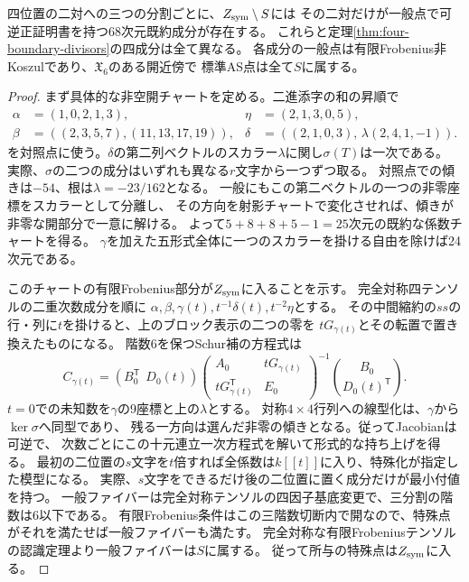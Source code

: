 \begin{theorem}[二対二配置による三つの追加境界因子]\label{thm:three-two-pair-divisors}
四位置の二対への三つの分割ごとに、$Z_{\rm sym}\setminus S$には
その二対だけが一般点で可逆正証明書を持つ68次元既約成分が存在する。
これらと定理\ref{thm:four-boundary-divisors}の四成分は全て異なる。
各成分の一般点は有限Frobenius非Koszulであり、$\mathfrak X_6$のある開近傍で
標準AS点は全て$S$に属する。
\end{theorem}
\begin{proof}
まず具体的な非空開チャートを定める。二進添字の和の昇順で
\[
\begin{aligned}
 \alpha&=(1,0,2,1,3), &\eta&=(2,1,3,0,5),\\
 \beta&=((2,3,5,7),(11,13,17,19)), &\delta&=((2,1,0,3),\,\lambda(2,4,1,-1)).
\end{aligned}
\]
を対照点に使う。$\delta$の第二列ベクトルのスカラー$\lambda$に関し$\sigma(T)$は一次である。
実際、$\sigma$の二つの成分はいずれも異なる$r$文字から一つずつ取る。
対照点での傾きは$-54$、根は$\lambda=-23/162$となる。
一般にもこの第二ベクトルの一つの非零座標をスカラーとして分離し、
その方向を射影チャートで変化させれば、傾きが非零な開部分で一意に解ける。
よって$5+8+8+5-1=25$次元の既約な係数チャートを得る。
$\gamma$を加えた五形式全体に一つのスカラーを掛ける自由を除けば24次元である。

このチャートの有限Frobenius部分が$Z_{\rm sym}$に入ることを示す。
完全対称四テンソルの二重次数成分を順に
$\alpha,\beta,\gamma(t),t^{-1}\delta(t),t^{-2}\eta$とする。
その中間縮約の$ss$の行・列に$t$を掛けると、上のブロック表示の二つの零を
$tG_{\gamma(t)}$とその転置で置き換えたものになる。
階数6を保つSchur補の方程式は
\[
 C_{\gamma(t)}=
 (B_0^{\mathsf T}\ \ D_0(t))
 \begin{pmatrix}A_0&tG_{\gamma(t)}\\tG_{\gamma(t)}^{\mathsf T}&E_0\end{pmatrix}^{-1}
 \binom{B_0}{D_0(t)^{\mathsf T}} .
\]
$t=0$での未知数を$\gamma$の9座標と上の$\lambda$とする。
対称$4\times4$行列への線型化は、$\gamma$から$\ker\sigma$へ同型であり、
残る一方向は選んだ非零の傾きとなる。従ってJacobianは可逆で、
次数ごとにこの十元連立一次方程式を解いて形式的な持ち上げを得る。
最初の二位置の$s$文字を$t$倍すれば全係数は$k[[t]]$に入り、特殊化が指定した模型になる。
実際、$s$文字をできるだけ後の二位置に置く成分だけが最小付値を持つ。
一般ファイバーは完全対称テンソルの四因子基底変更で、三分割の階数は6以下である。
有限Frobenius条件はこの三階数切断内で開なので、特殊点がそれを満たせば一般ファイバーも満たす。
完全対称な有限Frobeniusテンソルの認識定理より一般ファイバーは$S$に属する。
従って所与の特殊点は$Z_{\rm sym}$に入る。


\end{proof}
